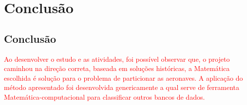 \documentclass[12pt]{article} %
\begin{document}
	\newpage
	\chapter{Conclusão}
		
		\section{Conclusão}
		
			\textcolor{red}{Ao desenvolver o estudo e as atividades, foi possível observar que, o projeto caminhou na direção correta, baseada em soluções históricas, a Matemática escolhida é solução para o problema de particionar as aeronaves. A aplicação do método apresentado foi desenvolvida genericamente a qual serve de ferramenta Matemática-computacional para classificar outros bancos de dados.}
			
\end{document}
